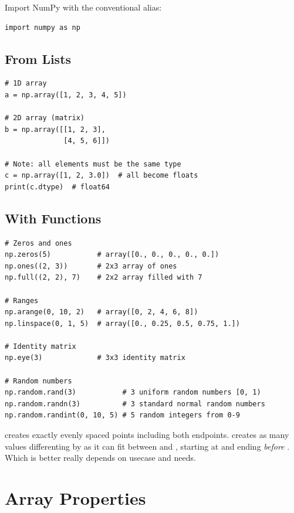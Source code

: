 Import NumPy with the conventional alias:

\begin{lstlisting}
import numpy as np
\end{lstlisting}

\subsection{From Lists}

\begin{lstlisting}
# 1D array
a = np.array([1, 2, 3, 4, 5])

# 2D array (matrix)
b = np.array([[1, 2, 3],
              [4, 5, 6]])

# Note: all elements must be the same type
c = np.array([1, 2, 3.0])  # all become floats
print(c.dtype)  # float64
\end{lstlisting}

\subsection{With Functions}

\begin{lstlisting}
# Zeros and ones
np.zeros(5)           # array([0., 0., 0., 0., 0.])
np.ones((2, 3))       # 2x3 array of ones
np.full((2, 2), 7)    # 2x2 array filled with 7

# Ranges
np.arange(0, 10, 2)   # array([0, 2, 4, 6, 8])
np.linspace(0, 1, 5)  # array([0., 0.25, 0.5, 0.75, 1.])

# Identity matrix
np.eye(3)             # 3x3 identity matrix

# Random numbers
np.random.rand(3)           # 3 uniform random numbers [0, 1)
np.random.randn(3)          # 3 standard normal random numbers
np.random.randint(0, 10, 5) # 5 random integers from 0-9
\end{lstlisting}

\begin{tip}
 creates exactly  evenly spaced points including both endpoints.  creates as many values differenting by  as it can fit between  and , starting at  and ending \textit{before} . Which is better really depends on usecase and needs.
\end{tip}

\section{Array Properties}
\label{sec:array-properties}

